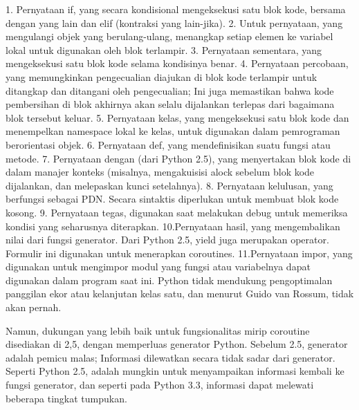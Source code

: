 	\begin {enumerate}
	1. Pernyataan if, yang secara kondisional mengeksekusi satu blok kode, bersama dengan yang lain dan elif (kontraksi yang lain-jika).
	2. Untuk pernyataan, yang mengulangi objek yang berulang-ulang, menangkap setiap elemen ke variabel lokal untuk digunakan oleh blok terlampir.
	3. Pernyataan sementara, yang mengeksekusi satu blok kode selama kondisinya benar.
	4. Pernyataan percobaan, yang memungkinkan pengecualian diajukan di blok kode terlampir untuk ditangkap dan ditangani oleh pengecualian; Ini juga memastikan bahwa kode pembersihan di blok akhirnya akan selalu dijalankan terlepas dari bagaimana blok tersebut keluar.
	5. Pernyataan kelas, yang mengeksekusi satu blok kode dan menempelkan namespace lokal ke kelas, untuk digunakan dalam pemrograman berorientasi objek.
	6. Pernyataan def, yang mendefinisikan suatu fungsi atau metode.
	7. Pernyataan dengan (dari Python 2.5), yang menyertakan blok kode di dalam manajer konteks (misalnya, mengakuisisi alock sebelum blok kode dijalankan, dan melepaskan kunci setelahnya).
	8. Pernyataan kelulusan, yang berfungsi sebagai PDN. Secara sintaktis diperlukan untuk membuat blok kode kosong.
	9. Pernyataan tegas, digunakan saat melakukan debug untuk memeriksa kondisi yang seharusnya diterapkan.
	10.Pernyataan hasil, yang mengembalikan nilai dari fungsi generator. Dari Python 2.5, yield juga merupakan operator. Formulir ini digunakan untuk menerapkan coroutines.
	11.Pernyataan impor, yang digunakan untuk mengimpor modul yang fungsi atau variabelnya dapat digunakan dalam program saat ini.
	Python tidak mendukung pengoptimalan panggilan ekor atau kelanjutan kelas satu, dan menurut Guido van Rossum, tidak akan pernah. 
	\end {enumerate}
	Namun, dukungan yang lebih baik untuk fungsionalitas mirip coroutine disediakan di 2,5, dengan memperluas generator Python. 
	Sebelum 2.5, generator adalah pemicu malas; Informasi dilewatkan secara tidak sadar dari generator. Seperti Python 2.5, adalah mungkin 
	untuk menyampaikan informasi kembali ke fungsi generator, dan seperti pada Python 3.3, informasi dapat melewati beberapa tingkat tumpukan.

